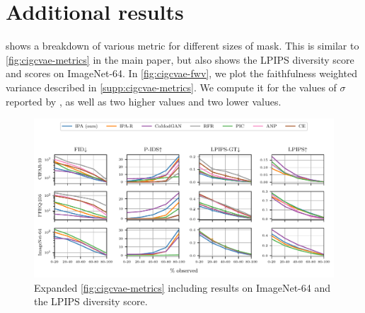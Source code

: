 \section{Additional results} \label{supp:cigcvae-additional-results}

 shows a breakdown of various metric for different sizes
of mask. This is similar to \cref{fig:cigcvae-metrics} in the main paper, but also shows
the LPIPS diversity score and scores on ImageNet-64. In \cref{fig:cigcvae-fwv}, we plot
the faithfulness weighted variance described in \cref{supp:cigcvae-metrics}. We compute
it for the values of $\sigma$ reported by \citet{li2020multimodal}, as well as
two higher values and two lower values.
\begin{figure}
  \includegraphics[width=\textwidth]{figs/cigcvae/extra-metrics}
  \caption{Expanded \cref{fig:cigcvae-metrics} including results on ImageNet-64 and the
    LPIPS diversity score.}
  \label{fig:cigcvae-extra-metrics}
\end{figure}


